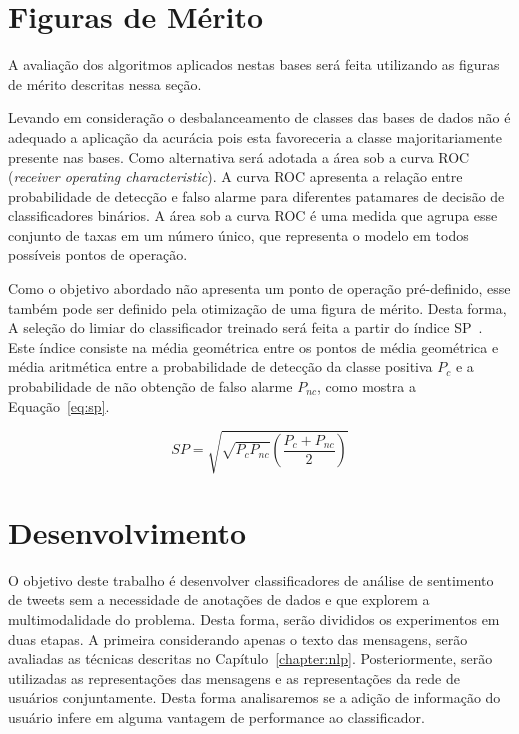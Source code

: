 \section{Figuras de Mérito}

A avaliação dos algoritmos aplicados nestas bases será feita utilizando as figuras
de mérito descritas nessa seção.

Levando em consideração o desbalanceamento de classes das bases de dados não é
adequado a aplicação da acurácia pois esta favoreceria a classe majoritariamente
presente nas bases.
Como alternativa será adotada a área sob a curva ROC (\textit{receiver operating
characteristic}).
A curva ROC apresenta a relação entre probabilidade de detecção e falso alarme
para diferentes patamares de decisão de classificadores binários.
A área sob a curva ROC é uma medida que agrupa esse conjunto de taxas em um
número único, que representa o modelo em todos possíveis pontos de operação.

Como o objetivo abordado não apresenta um ponto de operação pré-definido, esse
também pode ser definido pela otimização de uma figura de mérito.
Desta forma, A seleção do limiar do classificador treinado será feita a partir do
índice SP~\cite{ciodaro12}.
Este índice consiste na média geométrica entre os pontos de média geométrica e
média aritmética entre a probabilidade de detecção da classe positiva $P_c$ e a
probabilidade de não obtenção de falso alarme $P_{nc}$, como mostra a
Equação~\ref{eq:sp}.

\begin{equation} \label{eq:sp}
    SP = \sqrt{\sqrt{P_c P_{nc}} \left(\frac{P_c + P_{nc}}{2}\right)}
\end{equation}

\section{Desenvolvimento}
\label{sec:development}

O objetivo deste trabalho é desenvolver classificadores de análise de sentimento
de tweets sem a necessidade de anotações de dados e que explorem a multimodalidade
do problema.
Desta forma, serão divididos os experimentos em duas etapas.
A primeira considerando apenas o texto das mensagens, serão avaliadas as técnicas
descritas no Capítulo~\ref{chapter:nlp}.
Posteriormente, serão utilizadas as representações das mensagens e as
representações da rede de usuários conjuntamente.
Desta forma analisaremos se a adição de informação do usuário infere em alguma
vantagem de performance ao classificador.

